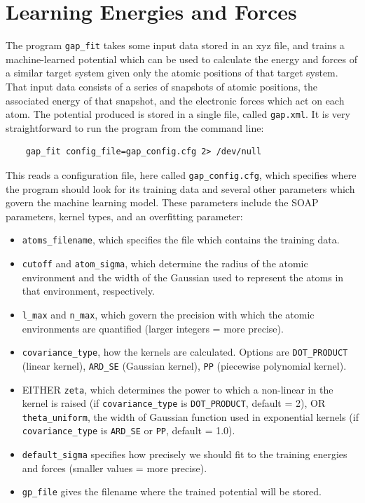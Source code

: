 \documentclass{article}
\begin{document}
\section{Learning Energies and Forces}

The program \verb|gap_fit| takes some input data stored in an xyz file, and trains a machine-learned potential which can be used to calculate the energy and forces of a similar target system given only the atomic positions of that target system. That input data consists of a series of snapshots of atomic positions, the associated energy of that snapshot, and the electronic forces which act on each atom. The potential produced is stored in a single file, called \verb|gap.xml|. It is very straightforward to run the program from the command line:
\begin{Verbatim}
    gap_fit config_file=gap_config.cfg 2> /dev/null
\end{Verbatim}
This reads a configuration file, here called \verb|gap_config.cfg|, which specifies where the program should look for its training data and several other parameters which govern the machine learning model. These parameters include the SOAP parameters, kernel types, and an overfitting parameter:
\begin{itemize}

\item \verb|atoms_filename|, which specifies the file which contains the training data.
\item \verb|cutoff| and \verb|atom_sigma|, which determine the radius of the atomic environment and the width of the Gaussian used to represent the atoms in that environment, respectively.
\item \verb|l_max| and \verb|n_max|, which govern the precision with which the atomic environments are quantified (larger integers = more precise).
\item \verb|covariance_type|, how the kernels are calculated. Options are \verb|DOT_PRODUCT| (linear kernel), \verb|ARD_SE| (Gaussian kernel), \verb|PP| (piecewise polynomial kernel).
\item EITHER \verb|zeta|, which determines the power to which a non-linear in the kernel is raised (if \verb|covariance_type| is \verb|DOT_PRODUCT|, default = 2), OR \verb|theta_uniform|, the width of Gaussian function used in exponential kernels (if \verb|covariance_type| is \verb|ARD_SE| or \verb|PP|, default = 1.0).
\item \verb|default_sigma| specifies how precisely we should fit to the training energies and forces (smaller values = more precise).
\item \verb|gp_file| gives the filename where the trained potential will be stored.

\end{itemize}
\end{document}
